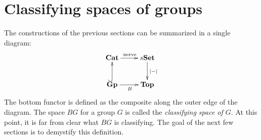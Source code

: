 \section{Classifying spaces of groups}\label{classifying-g-bundles}
%
The constructions of the previous sections can be summarized in a single
diagram:
\begin{equation*}
    \xymatrix{
	\Cat\ar[r]^{\text{nerve}} & s\Set\ar[d]^{|-|}\\
	\mathbf{Gp}\ar@{^(->}[u]\ar[r]_{B} & \Top
    }
\end{equation*}
The bottom functor is defined as the composite along the outer edge of the
diagram. The space $BG$ for a group $G$ is called the \emph{classifying space
of $G$}. At this point, it is far from clear what $BG$ is classifying. The goal
of the next few sections is to demystify this definition.

